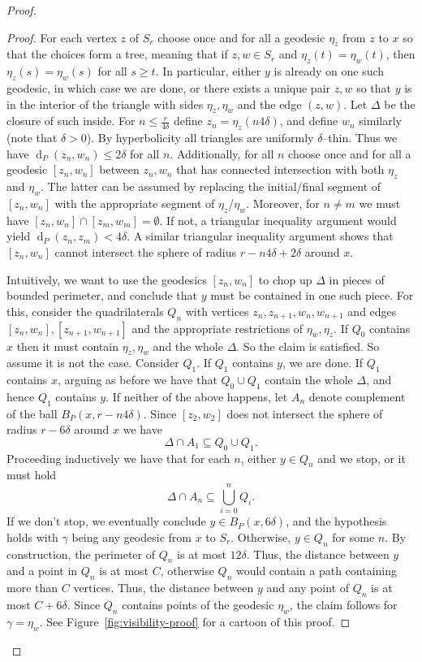 \documentclass[11pt,a4paper]{amsart}
\DeclareMathOperator{\dist}{d}
\theoremstyle{definition}
\begin{document}
\begin{proof}
    \begin{proof}
		For each vertex $z$ of $S_r$ choose once and for all a geodesic $\eta_z$ from $z$ to $x$ so that the choices form a tree, meaning that if $z,w\in S_r$ and $\eta_z(t) =\eta_w(t)$, then $\eta_z(s)  =\eta_w(s)$ for all $s\geq t$. In particular, either $y$ is already on one such geodesic, in which case we are done, or there exists a unique pair $z, w$ so that $y$ is in the interior of the triangle with sides $\eta_z, \eta_w$ and the edge $(z,w)$. Let $\Delta$ be the closure of such inside.  For $ n \leq \frac{r}{4\delta}$ define $z_n = \eta_z(n 4\delta)$, and define $w_n$ similarly (note that $\delta>0$). By hyperbolicity all triangles are uniformly $\delta$--thin. Thus we have $\dist_P(z_n, w_n) \leq  2\delta$ for all $n$. Additionally, for all $n$ choose once and for all a geodesic $[z_n, w_n]$ between $z_n, w_n$ that has connected intersection with both $\eta_z$ and $\eta_w$. The latter can be assumed by replacing the initial/final segment of $[z_n, w_n]$ with the appropriate segment of $\eta_z$/$\eta_w$. Moreover, for $n \neq m$ we must have $[z_n, w_n] \cap [z_m, w_m] = \emptyset$. If not, a triangular inequality argument would yield $\dist_P(z_n, z_m) < 4\delta$. A similar triangular inequality argument shows that $[z_n, w_n]$ cannot intersect the sphere of radius $ r- n4\delta + 2 \delta$ around $x$.    
        
    Intuitively, we want to use the geodesics $[z_n, w_n]$ to chop up  $\Delta$ in pieces of bounded perimeter, and conclude that $y$ must be contained in one such piece. For this, consider the quadrilaterals $Q_n$ with vertices $z_n, z_{n+1}, w_n, w_{n+1}$ and edges $[z_n, w_n], [z_{n+1},w_{n+1}]$ and the appropriate restrictions of $\eta_w, \eta_z$. If $Q_0$ contains $x$ then it must contain $\eta_z, \eta_w$ and the whole $\Delta$. So the claim is satisfied. So assume it is not the case. Consider $Q_1$. If $Q_1$ contains $y$, we are done. If $Q_1$ contains $x$, arguing as before we have that $Q_0 \cup Q_1$ contain the whole $\Delta$, and hence $Q_1$ contains $y$. If neither of the above happens, let $A_{n}$ denote complement of the ball $B_P(x, r-n4\delta)$. Since $[z_2, w_2]$ does not intersect the sphere of radius $r - 6\delta$ around $x$ we have 
    \[\Delta \cap  A_1 \subseteq Q_0 \cup Q_1.\]
    Proceeding inductively we have that for each $n$, either $y\in Q_n$ and we stop, or it must hold \[\Delta \cap A_n \subseteq \bigcup_{i =0}^n Q_i.\]
		If we don't stop, we eventually conclude $y \in B_P(x, 6\delta)$, and the hypothesis holds with $\gamma$ being any geodesic from $x$ to $S_r$. Otherwise, $y\in Q_n$ for some $n$. By construction, the perimeter of $Q_n$ is at most $12\delta$. Thus, the distance between $y$ and a point in $Q_n$ is at most $C$, otherwise $Q_n$ would contain a path containing more than $C$ vertices. Thus, the distance between $y$ and any point of $Q_n$ is at most $C+6\delta$. Since $Q_n$ contains points of the geodesic $\eta_w$, the claim follows for $\gamma = \eta_w$. See Figure~\ref{fig:visibility-proof} for a cartoon of this proof.
    \end{proof}


\end{proof}
\end{document}
